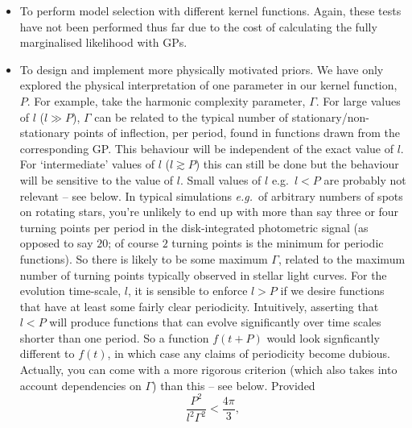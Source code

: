 \documentclass[useAMS, usenatbib, preprint, 12pt]{aastex}
\newcommand{\eg}{{\it e.g.}}
\begin{document}
\begin{itemize}
\item{To perform model selection with different kernel functions. Again, these
    tests have not been performed thus far due to the cost of calculating the
        fully marginalised likelihood with GPs.}
\item{To design and implement more physically motivated priors.
We have only explored the physical interpretation of one parameter in our
        kernel function, $P$.
For example, take the harmonic complexity parameter, $\Gamma$.
        For large values of $l$ ($l\gg P$), $\Gamma$ can be related to the
        typical number of stationary/non-stationary points of inflection, per
        period, found in functions drawn from the corresponding GP.
        This behaviour will be independent of the exact value of $l$.
        For `intermediate' values of $l$ ($l\gtrsim P$) this can still be done
        but the behaviour will be sensitive to the value of $l$.
        Small values of $l$ e.g.\ $l<P$ are probably not relevant -- see
        below.
        In typical simulations \eg\ of arbitrary numbers of spots on rotating
        stars, you're unlikely to end up with more than say three or four
        turning points per period in the disk-integrated photometric signal
        (as opposed to say $20$; of course $2$ turning points is the minimum
        for periodic functions).
        So there is likely to be some maximum $\Gamma$, related to the maximum
        number of turning points typically observed in stellar light curves.
For the evolution time-scale, $l$, it is sensible to enforce $l>P$ if we
        desire functions that have at least some fairly clear
        periodicity.
        Intuitively, asserting that $l<P$ will produce functions that can
        evolve significantly over time scales shorter than one period.
        So a function $f(t+P)$ would look signficantly different to $f(t)$,
        in which case any claims of periodicity become dubious.
        Actually, you can come with a more rigorous criterion (which also
        takes into account dependencies on $\Gamma$) than this -- see below.
        Provided
        \begin{equation}
        \frac{{{P^2}}}{{{l^2}{\Gamma ^2}}} < \frac{{4\pi }}{3},

\end{equation}}
\end{itemize}
\end{document}
